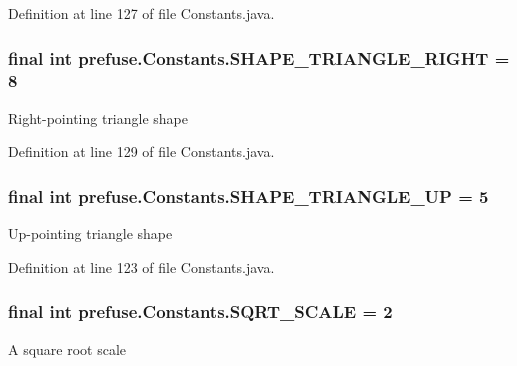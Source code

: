 \-Definition at line 127 of file \-Constants.\-java.

\hypertarget{interfaceprefuse_1_1_constants_aac60a6d86dc1127d8e4a0a37ef9c8d5e}{
\subsubsection[{\-S\-H\-A\-P\-E\-\_\-\-T\-R\-I\-A\-N\-G\-L\-E\-\_\-\-R\-I\-G\-H\-T}]{\setlength{\rightskip}{0pt plus 5cm}final int {\bf prefuse.\-Constants.\-S\-H\-A\-P\-E\-\_\-\-T\-R\-I\-A\-N\-G\-L\-E\-\_\-\-R\-I\-G\-H\-T} = 8}}\label{interfaceprefuse_1_1_constants_aac60a6d86dc1127d8e4a0a37ef9c8d5e}
\-Right-\/pointing triangle shape 

\-Definition at line 129 of file \-Constants.\-java.

\hypertarget{interfaceprefuse_1_1_constants_a7ead8af57c70ad295075f7bf0339e0b8}{
\subsubsection[{\-S\-H\-A\-P\-E\-\_\-\-T\-R\-I\-A\-N\-G\-L\-E\-\_\-\-U\-P}]{\setlength{\rightskip}{0pt plus 5cm}final int {\bf prefuse.\-Constants.\-S\-H\-A\-P\-E\-\_\-\-T\-R\-I\-A\-N\-G\-L\-E\-\_\-\-U\-P} = 5}}\label{interfaceprefuse_1_1_constants_a7ead8af57c70ad295075f7bf0339e0b8}
\-Up-\/pointing triangle shape 

\-Definition at line 123 of file \-Constants.\-java.

\hypertarget{interfaceprefuse_1_1_constants_a70b7cc2c717b3794b4be67ae4e5c3f67}{
\subsubsection[{\-S\-Q\-R\-T\-\_\-\-S\-C\-A\-L\-E}]{\setlength{\rightskip}{0pt plus 5cm}final int {\bf prefuse.\-Constants.\-S\-Q\-R\-T\-\_\-\-S\-C\-A\-L\-E} = 2}}\label{interfaceprefuse_1_1_constants_a70b7cc2c717b3794b4be67ae4e5c3f67}
\-A square root scale 

